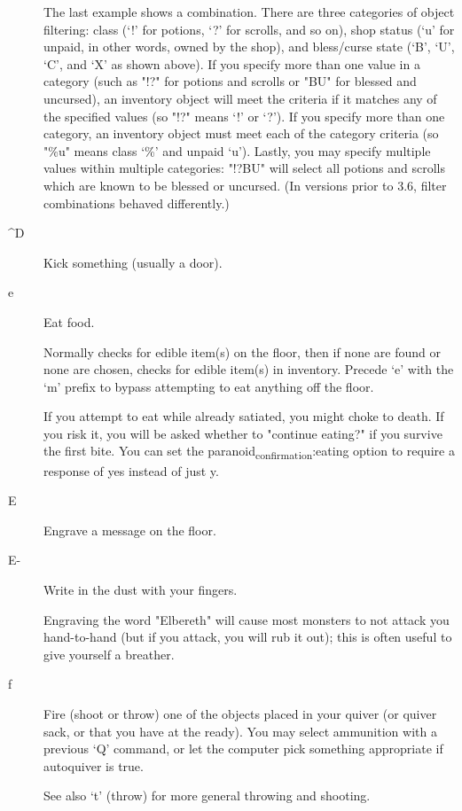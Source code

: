\documentclass[11pt]{article}
\begin{document}
\begin{description}
The last example shows a combination. There are three categories of
object filtering: class (`!' for potions, `?' for scrolls, and so
on), shop status (`u' for unpaid, in other words, owned by the
shop), and bless/curse state (`B', `U', `C', and `X' as shown
above). If you specify more than one value in a category (such as
"!?" for potions and scrolls or "BU" for blessed and uncursed), an
inventory object will meet the criteria if it matches any of the
specified values (so "!?" means `!' or `?'). If you specify more
than one category, an inventory object must meet each of the
category criteria (so "\%u" means class `\%' and unpaid `u'). Lastly,
you may specify multiple values within multiple categories: "!?BU"
will select all potions and scrolls which are known to be blessed or
uncursed. (In versions prior to 3.6, filter combinations behaved
differently.)

\item[{\^{}D}] Kick something (usually a door).

\item[{e}] Eat food.

Normally checks for edible item(s) on the floor, then if none are
found or none are chosen, checks for edible item(s) in
inventory. Precede `e' with the `m' prefix to bypass attempting to
eat anything off the floor. 

If you attempt to eat while already satiated, you might choke to
death. If you risk it, you will be asked whether to "continue
eating?" if you survive the first bite.  You can set the
paranoid\textsubscript{confirmation}:eating option to require a response of yes
instead of just y.

\item[{E}] Engrave a message on the floor.

\item[{E-}] Write in the dust with your fingers.

Engraving the word "Elbereth" will cause most monsters to not attack
you hand-to-hand (but if you attack, you will rub it out); this is
often useful to give yourself a breather.

\item[{f}] Fire (shoot or throw) one of the objects placed in your quiver
(or quiver sack, or that you have at the ready). You may select
ammunition with a previous `Q' command, or let the computer pick
something appropriate if autoquiver is true. 

See also `t' (throw) for more general throwing and shooting.


\end{description}
\end{document}

